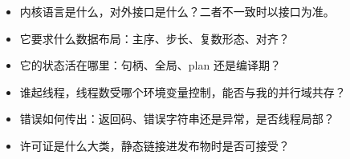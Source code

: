\documentclass[12pt,a4paper,fontset=fandol]{ctexbook}
\begin{document}
\begin{bestpractice}[title={接手一个陌生库的六个问题}]
\begin{itemize}
\item 内核语言是什么，对外接口是什么？二者不一致时以接口为准。
\item 它要求什么数据布局：主序、步长、复数形态、对齐？
\item 它的状态活在哪里：句柄、全局、plan 还是编译期？
\item 谁起线程，线程数受哪个环境变量控制，能否与我的并行域共存？
\item 错误如何传出：返回码、错误字符串还是异常，是否线程局部？
\item 许可证是什么大类，静态链接进发布物时是否可接受？
\end{itemize}
\end{bestpractice}
\end{document}
